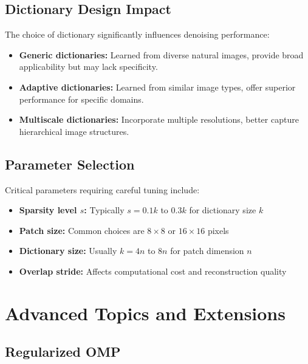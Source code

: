 \documentclass[12pt]{article}
\theoremstyle{definition}
\begin{document}
\subsection{Dictionary Design Impact}
\label{subsec:dict_impact}

The choice of dictionary significantly influences denoising performance:

\begin{itemize}[leftmargin=*]
    \item \textbf{Generic dictionaries:} Learned from diverse natural images, provide broad applicability but may lack specificity.

    \item \textbf{Adaptive dictionaries:} Learned from similar image types, offer superior performance for specific domains.

    \item \textbf{Multiscale dictionaries:} Incorporate multiple resolutions, better capture hierarchical image structures.
\end{itemize}

\subsection{Parameter Selection}
\label{subsec:parameter_selection}

Critical parameters requiring careful tuning include:

\begin{itemize}[leftmargin=*]
    \item \textbf{Sparsity level $s$:} Typically $s = 0.1k$ to $0.3k$ for dictionary size $k$
    \item \textbf{Patch size:} Common choices are $8 \times 8$ or $16 \times 16$ pixels
    \item \textbf{Dictionary size:} Usually $k = 4n$ to $8n$ for patch dimension $n$
    \item \textbf{Overlap stride:} Affects computational cost and reconstruction quality
\end{itemize}

\newpage

\section{Advanced Topics and Extensions}
\label{sec:advanced}

\subsection{Regularized OMP}
\label{subsec:regularized_omp}
\end{document}
